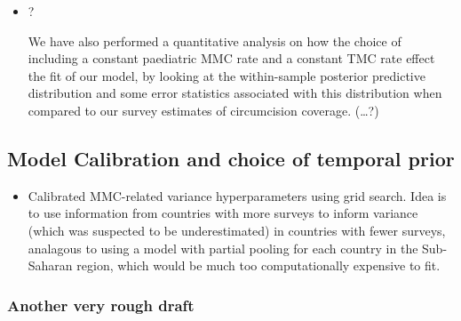 \documentclass{article}
\begin{document}
\begin{itemize}
\item ?
\label{sec:orga66d62a}

We have also performed a quantitative analysis on how the choice of including a constant paediatric MMC rate and a constant TMC rate effect the fit of our model, by looking at the within-sample posterior predictive distribution and some error statistics associated with this distribution when compared to our survey estimates of circumcision coverage. (\ldots{}?)
\end{itemize}

\subsection*{Model Calibration and choice of temporal prior}
\label{sec:orgd257719}

\begin{itemize}
\item Calibrated MMC-related variance hyperparameters using grid search. Idea is to use information
from countries with more surveys to inform variance (which was suspected to be underestimated)
in countries with fewer surveys, analagous to using a model with partial pooling for each
country in the Sub-Saharan region, which would be much too computationally expensive to fit.
\end{itemize}

\subsubsection*{Another very rough draft}
\label{sec:org23cd822}
\end{document}
